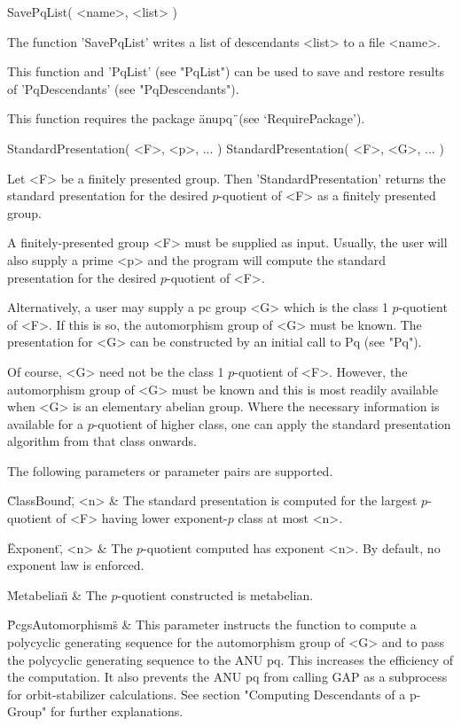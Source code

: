 \>SavePqList( <name>, <list> )

The function 'SavePqList' writes a list of  descendants  <list> to a file
<name>.

This function and 'PqList' (see "PqList") can be used to save and restore
results of 'PqDescendants' (see "PqDescendants").

This function requires the package \"anupq\"\ (see `RequirePackage').


\>StandardPresentation( <F>, <p>, ...  )
\>StandardPresentation( <F>, <G>, ...  )

Let  <F> be  a  finitely  presented group.   Then  'StandardPresentation'
returns the standard presentation for the  desired $p$-quotient of <F> as
a finitely presented group.

A  finitely-presented group <F> must be  supplied  as input. Usually, the
user will  also  supply a prime  <p> and  the  program will  compute  the
standard presentation for the desired $p$-quotient of <F>.

Alternatively, a user  may supply a pc group <G> which  is the class 1
$p$-quotient of <F>. If this is so, the automorphism group of <G> must
be known.  The  presentation for <G> can be  constructed by an initial
call to Pq (see "Pq").

Of course, <G> need not be  the class 1 $p$-quotient of <F>.  However,
the automorphism group  of <G> must be known and  this is most readily
available  when  <G>  is  an  elementary  abelian  group.   Where  the
necessary information is available for a $p$-quotient of higher class,
one  can apply  the standard  presentation algorithm  from  that class
onwards.

The following parameters or parameter pairs are supported.

\beginitems
\"ClassBound\", <n> &
    The  standard presentation is  computed for  the largest $p$-quotient
    of <F> having lower exponent-$p$ class at most <n>.

\"Exponent\", <n> &
    The $p$-quotient computed has  exponent <n>.  By default, no exponent
    law is enforced.

\"Metabelian\" &
    The $p$-quotient constructed is metabelian.

\"PcgsAutomorphisms\" &
    This  parameter  instructs  the  function  to  compute  a  polycyclic
    generating sequence for the automorphism group of <G> and to pass the
    polycyclic  generating sequence to  the ANU  pq.  This  increases the
    efficiency  of the  computation.  It  also prevents  the ANU  pq from
    calling GAP  as a subprocess for  orbit-stabilizer calculations.  See
    section   "Computing   Descendants   of   a  p-Group"   for   further
    explanations.

